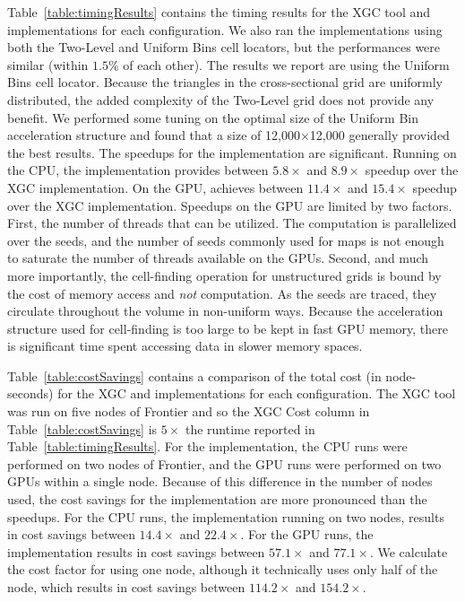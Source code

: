 Table~\ref{table:timingResults} contains the timing results for the XGC tool and \vtkm implementations for each configuration.
We also ran the \vtkm implementations using both the Two-Level and Uniform Bins cell locators, but the performances were similar (within $1.5\%$ of each other). The results we report are using the Uniform Bins cell locator. Because the triangles in the cross-sectional grid are uniformly distributed, the added complexity of the Two-Level grid does not provide any benefit. We performed some tuning on the optimal size of the Uniform Bin acceleration structure and found that a size of 12,000$\times$12,000 generally provided the best results.
The speedups for the \vtkm implementation are significant. Running on the CPU, the \vtkm implementation provides between $5.8\times$ and $8.9\times$ speedup over the XGC implementation. On the GPU, \vtkm achieves between $11.4\times$ and $15.4\times$ speedup over the XGC implementation. 
Speedups on the GPU are limited by two factors. First, the number of threads that can be utilized. The computation is parallelized over the seeds, and the number of seeds commonly used for \poincare maps is not enough to saturate the number of threads available on the GPUs. Second, and much more importantly, the cell-finding operation for unstructured grids is bound by the cost of memory access and \emph{not} computation. As the seeds are traced, they circulate throughout the volume in non-uniform ways. Because the acceleration structure used for cell-finding is too large to be kept in fast GPU memory, there is significant time spent accessing data in slower memory spaces.



Table~\ref{table:costSavings} contains a comparison of the total cost (in node-seconds) for the XGC and \vtkm implementations for each configuration. The XGC tool was run on five nodes of Frontier and so the XGC Cost column in Table~\ref{table:costSavings} is $5\times$ the runtime reported in Table~\ref{table:timingResults}. For the \vtkm implementation, the CPU runs were performed on two nodes of Frontier, and the GPU runs were performed on two GPUs within a single node.  Because of this difference in the number of nodes used, the cost savings for the \vtkm implementation are more pronounced than the speedups. For the CPU runs, the \vtkm implementation running on two nodes, results in cost savings between $14.4\times$ and $22.4\times$. For the GPU runs, the \vtkm implementation results in cost savings between $57.1\times$ and $77.1\times$.  We calculate the cost factor for \vtkm using one node, although it technically uses only half of the node, which results in cost savings between $114.2\times$ and $154.2\times$.

